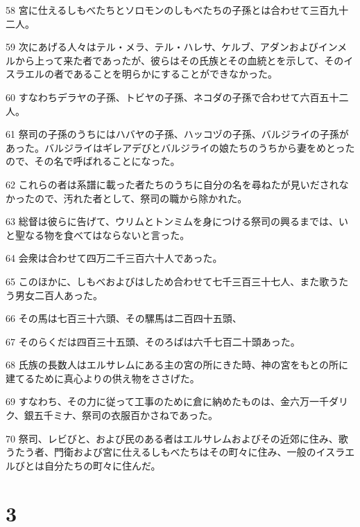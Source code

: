 \par 58 宮に仕えるしもべたちとソロモンのしもべたちの子孫とは合わせて三百九十二人。
\par 59 次にあげる人々はテル・メラ、テル・ハレサ、ケルブ、アダンおよびインメルから上って来た者であったが、彼らはその氏族とその血統とを示して、そのイスラエルの者であることを明らかにすることができなかった。
\par 60 すなわちデラヤの子孫、トビヤの子孫、ネコダの子孫で合わせて六百五十二人。
\par 61 祭司の子孫のうちにはハバヤの子孫、ハッコヅの子孫、バルジライの子孫があった。バルジライはギレアデびとバルジライの娘たちのうちから妻をめとったので、その名で呼ばれることになった。
\par 62 これらの者は系譜に載った者たちのうちに自分の名を尋ねたが見いだされなかったので、汚れた者として、祭司の職から除かれた。
\par 63 総督は彼らに告げて、ウリムとトンミムを身につける祭司の興るまでは、いと聖なる物を食べてはならないと言った。
\par 64 会衆は合わせて四万二千三百六十人であった。
\par 65 このほかに、しもべおよびはしため合わせて七千三百三十七人、また歌うたう男女二百人あった。
\par 66 その馬は七百三十六頭、その騾馬は二百四十五頭、
\par 67 そのらくだは四百三十五頭、そのろばは六千七百二十頭あった。
\par 68 氏族の長数人はエルサレムにある主の宮の所にきた時、神の宮をもとの所に建てるために真心よりの供え物をささげた。
\par 69 すなわち、その力に従って工事のために倉に納めたものは、金六万一千ダリク、銀五千ミナ、祭司の衣服百かさねであった。
\par 70 祭司、レビびと、および民のある者はエルサレムおよびその近郊に住み、歌うたう者、門衛および宮に仕えるしもべたちはその町々に住み、一般のイスラエルびとは自分たちの町々に住んだ。

\chapter{3}


